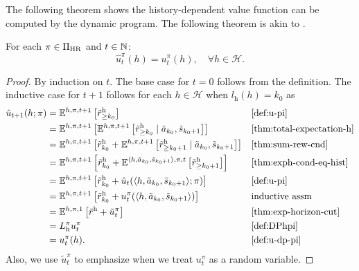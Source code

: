 The following theorem shows the history-dependent value function can be computed by the dynamic program. The following theorem is akin to \citep[theorem~4.2.1]{Puterman2005}.
\begin{theorem} \label{thm:dph-correct-vf}
For each $\pi\in \Pi_{\mathrm{HR}}$ and $t\in \mathbb{N}$:
  \[
    \hat{u}^{\pi}_t(h)
    =
    u^{\pi}_t(h), \quad \forall h\in \mathcal{H}.
  \]
\end{theorem}
\begin{proof}
By induction on $t$. The base case for $t=0$ follows from the definition. The inductive case for $t + 1$ follows for each $h\in \mathcal{H}$ when $l_{\mathrm{h}}(h) = k_0$ as
{\allowdisplaybreaks
\begin{align*}
\hat{u}_{t+1}(h; \pi)
&= \E^{h, \pi, t+1} \left[ \rew_{\ge k_0}  \right] && \text{\cref{def:u-pi}}\\
&= \E^{h, \pi, t+1} \left[  \E^{h, \pi, t+1} \left[ \rew_{\ge k_0} \mid \tilde{a}_{k_0}, \tilde{s}_{k_0+1} \right] \right]  && \text{\cref{thm:total-expectation-h}} \\
&= \E^{h, \pi, t+1} \left[\rew_{k_0} +  \E^{h, \pi, t+1} \left[  \rew_{\ge k_0+1} \mid \tilde{a}_{k_0}, \tilde{s}_{k_0+1} \right] \right] && \text{\cref{thm:sum-rew-cnd}} \\
&= \E^{h, \pi, t+1} \left[\rew_{k_0} +  \E^{\langle h,\tilde{a}_{k_0},\tilde{s}_{k_0+1}\rangle, \pi, t} \left[ \rew_{\ge k_0+1} \right]\right] && \text{\cref{thm:exph-cond-eq-hist}} \\
&= \E^{h, \pi, t+1} \left[\rew_{k_0} +  \hat{u}_t(\langle h,\tilde{a}_{k_0},\tilde{s}_{k_0+1}\rangle; \pi) \right] && \text{\cref{def:u-pi}} \\
&= \E^{h, \pi, t+1} \left[\rew_{k_0} +  u^{\pi}_t(\langle h,\tilde{a}_{k_0},\tilde{s}_{k_0+1}\rangle) \right] && \text{inductive assm} \\
&= \E^{h, \pi, 1} \left[\rew +  \tilde{u}^{\pi}_t \right] && \text{\cref{thm:exp-horizon-cut}} \\
&= L_{\mathrm{h}}^{\pi} u_t^{\pi} && \text{\cref{def:DPhpi}} \\
&= u^{\pi}_t(h). && \text{\cref{def:u-dp-pi}}
\end{align*}
}
Also, we use $\tilde{u}_t^{\pi}$ to emphasize when we treat $u^{\pi}_t$ as a random variable. 

\end{proof}
